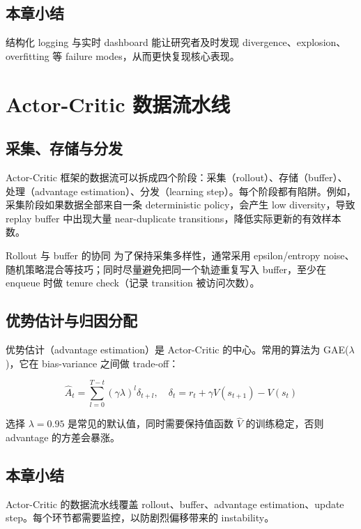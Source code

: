 \documentclass[a4paper]{article}
\begin{document}
\subsection{本章小结}

结构化 logging 与实时 dashboard 能让研究者及时发现 divergence、explosion、overfitting 等 failure modes，从而更快复现核心表现。

\section{Actor-Critic 数据流水线}

\subsection{采集、存储与分发}

Actor-Critic 框架的数据流可以拆成四个阶段：采集（rollout）、存储（buffer）、处理（advantage estimation）、分发（learning step）。每个阶段都有陷阱。例如，采集阶段如果数据全部来自一条 deterministic policy，会产生 low diversity，导致 replay buffer 中出现大量 near-duplicate transitions，降低实际更新的有效样本数。

\begin{knowledgebox}{Rollout 与 buffer 的协同}
为了保持采集多样性，通常采用 epsilon/entropy noise、随机策略混合等技巧；同时尽量避免把同一个轨迹重复写入 buffer，至少在 enqueue 时做 tenure check（记录 transition 被访问次数）。
\end{knowledgebox}

\subsection{优势估计与归因分配}

优势估计（advantage estimation）是 Actor-Critic 的中心。常用的算法为 GAE($\lambda$)，它在 bias-variance 之间做 trade-off：

$$\hat{A}_t = \sum_{l=0}^{T-t}(\gamma \lambda)^l \delta_{t+l},\quad \delta_t = r_t + \gamma V(s_{t+1}) - V(s_t)$$

选择 $\lambda=0.95$ 是常见的默认值，同时需要保持值函数 $\hat{V}$ 的训练稳定，否则 advantage 的方差会暴涨。

\subsection{本章小结}

Actor-Critic 的数据流水线覆盖 rollout、buffer、advantage estimation、update step。每个环节都需要监控，以防剧烈偏移带来的 instability。
\end{document}
